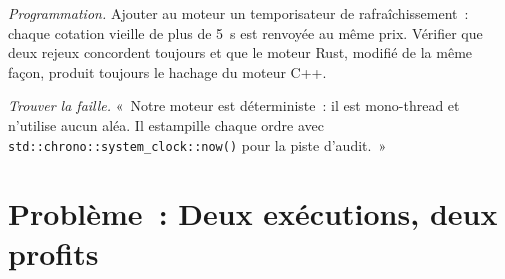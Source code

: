 \begin{exercise}[$\star\star\star$]\label{exo:ll:the-strategy-engine:7}
\emph{Programmation.} Ajouter au moteur un temporisateur de rafraîchissement~: chaque cotation vieille de plus de \qty{5}{\second} est renvoyée au même prix. Vérifier
que deux rejeux concordent toujours et que le moteur Rust, modifié de la même façon, produit toujours le hachage du moteur C++.
\end{exercise}

\begin{exercise}[$\star\star\star$]\label{exo:ll:the-strategy-engine:8}
\emph{Trouver la faille.} «~Notre moteur est déterministe~: il est mono-thread et n'utilise aucun aléa. Il estampille chaque ordre avec
\texttt{std::chrono::system\_clock::now()} pour la piste d'audit.~»
\end{exercise}

\section{Problème~: Deux exécutions, deux profits}

